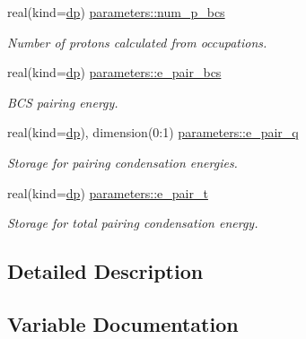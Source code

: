 \begin{DoxyCompactItemize}
real(kind=\mbox{\hyperlink{namespaceparameters_a52f8c6351fd79345d8811e065bcbbb37}{dp}}) \mbox{\hyperlink{group__PAIRING_gaedb771510f7d66badb70bbe3e2ad28c2}{parameters\+::num\+\_\+p\+\_\+bcs}}
\begin{DoxyCompactList}\small\item\em Number of protons calculated from occupations. \end{DoxyCompactList}\item 
real(kind=\mbox{\hyperlink{namespaceparameters_a52f8c6351fd79345d8811e065bcbbb37}{dp}}) \mbox{\hyperlink{group__PAIRING_gae25457a2576ddbfa6a0c4bda3f4f7f58}{parameters\+::e\+\_\+pair\+\_\+bcs}}
\begin{DoxyCompactList}\small\item\em B\+CS pairing energy. \end{DoxyCompactList}\item 
real(kind=\mbox{\hyperlink{namespaceparameters_a52f8c6351fd79345d8811e065bcbbb37}{dp}}), dimension(0\+:1) \mbox{\hyperlink{group__PAIRING_ga9bc3597a7161607a24ef358150c703b1}{parameters\+::e\+\_\+pair\+\_\+q}}
\begin{DoxyCompactList}\small\item\em Storage for pairing condensation energies. \end{DoxyCompactList}\item 
real(kind=\mbox{\hyperlink{namespaceparameters_a52f8c6351fd79345d8811e065bcbbb37}{dp}}) \mbox{\hyperlink{group__PAIRING_ga7791448dd4d929ad8528cfb98b9f984b}{parameters\+::e\+\_\+pair\+\_\+t}}
\begin{DoxyCompactList}\small\item\em Storage for total pairing condensation energy. \end{DoxyCompactList}\end{DoxyCompactItemize}


\subsection{Detailed Description}


\subsection{Variable Documentation}
\mbox{\label{group__PAIRING_ga1a7cf61c64e34d8c4ff1348bea510826}} 
